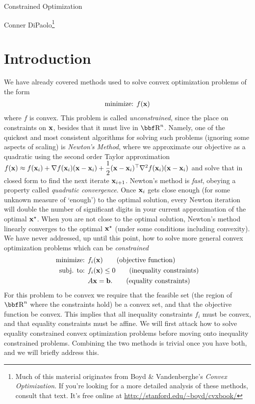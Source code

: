 \documentclass[12pt,letterpaper]{article}
\begin{document}
\begin{center}
    \large Constrained Optimization

    \normalsize Conner DiPaolo\footnote{Much of this material originates from
    Boyd \& Vandenberghe's \textit{Convex Optimization}. If you're looking for
    a more detailed analysis of these methods, consult that text. It's free online
    at \url{http://stanford.edu/~boyd/cvxbook/}}
\end{center}
\vspace{3\baselineskip}

\section{Introduction}

We have already covered methods used to solve convex optimization problems of
the form
\begin{align*}
    \text{minimize: } & f({\bf x})\\
\end{align*}
where $f$ is convex. This problem is called \textit{unconstrained}, since the place
on constraints on ${\bf x}$, besides that it must live in $\RR^n$. Namely, one of the
quickest and most consistent algorithms for solving such problems (ignoring some aspects
of scaling) is \textit{Newton's Method}, where we approximate our objective as a quadratic
using the second order Taylor approximation $f({\bf x}) \approx f({\bf x}_i) + \nabla f({\bf x}_i)({\bf x} - {\bf x}_i)
+ \dfrac{1}{2}({\bf x} - {\bf x}_i)^\top\nabla^2 f({\bf x}_i) ({\bf x} - {\bf x}_i)$ and solve that in closed form
to find the next iterate ${\bf x}_{i+1}$. Newton's method is \textit{fast}, obeying a property
called \textit{quadratic convergence}. Once ${\bf x}_i$ gets close enough (for some unknown measure
of `enough') to the optimal solution, every Newton iteration will double the number of significant
digits in your current approximation of the optimal ${\bf x}^\star$. When you are not close to
the optimal solution, Newton's method linearly converges to the optimal ${\bf x}^\star$ (under some conditions
including convexity). We have never addressed, up until this point, how to solve more general convex
optimization problems which can be \textit{constrained}
\begin{align*}
    \text{minimize: } & f_i({\bf x})        \tag{objective function}\\
    \text{subj. to: } & f_i({\bf x}) \leq 0 \tag{inequality constraints}\\
                      & A{\bf x} = {\bf b}.     \tag{equality constraints}
\end{align*}
For this problem to be convex we require that the feasible set (the region of $\RR^n$ where the
constraints hold) be a convex set, and that the objective function be convex. This implies that
all inequality constraints $f_i$ must be convex, and that equality constraints must be affine.
We will first attack how to solve equality constrained convex optimization problems before
moving onto inequality constrained problems. Combining the two methods is trivial once you have
both, and we will briefly address this.
\end{document}
